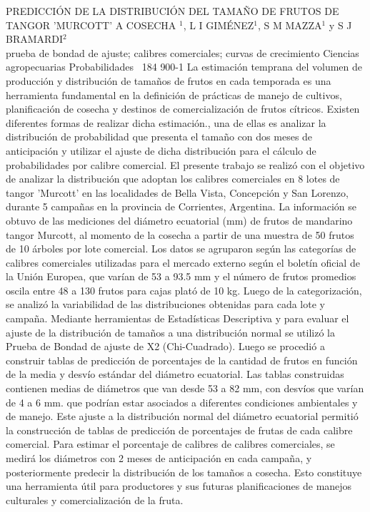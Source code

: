 \A
{PREDICCIÓN DE LA DISTRIBUCIÓN DEL TAMAÑO DE FRUTOS DE TANGOR 'MURCOTT' A COSECHA}
{$^1$, L I GIMÉNEZ$^1$, S M MAZZA$^1$ y S J BRAMARDI$^2$}
{
\\}
{prueba de bondad de ajuste; calibres comerciales; curvas de crecimiento} 
 {Ciencias agropecuarias} 
 {Probabilidades } 
 {184} 
 {900-1}
{La estimación temprana del volumen de producción y distribución de tamaños de frutos en cada temporada es una herramienta fundamental en la definición de prácticas de manejo de cultivos, planificación de cosecha y destinos de comercialización de frutos cítricos. Existen diferentes formas de realizar dicha estimación., una de ellas es analizar la distribución de probabilidad que presenta el tamaño con dos meses de anticipación y utilizar el ajuste de dicha distribución para el cálculo de probabilidades por calibre comercial. El presente trabajo se realizó con el objetivo de analizar la distribución que adoptan los calibres comerciales en 8 lotes de tangor 'Murcott' en las localidades de Bella Vista, Concepción y San Lorenzo, durante 5 campañas en la provincia de Corrientes, Argentina. La información se obtuvo de las mediciones del diámetro ecuatorial (mm) de frutos de mandarino tangor Murcott, al momento de la cosecha a partir de una muestra de 50 frutos de 10 árboles por lote comercial. Los datos se agruparon según las categorías de calibres comerciales utilizadas para el mercado externo según el boletín oficial de la Unión Europea, que varían de 53 a 93.5 mm y el número de frutos promedios oscila entre 48 a 130 frutos para cajas plató de 10 kg. Luego de la categorización, se analizó la variabilidad de las distribuciones obtenidas para cada lote y campaña. Mediante herramientas de Estadísticas Descriptiva y para evaluar el ajuste de la distribución de tamaños a una distribución normal se utilizó la Prueba de Bondad de ajuste de X2 (Chi-Cuadrado). Luego se procedió a construir tablas de predicción de porcentajes de la cantidad de frutos en función de la media y desvío estándar del diámetro ecuatorial. Las tablas construidas contienen medias de diámetros que van desde 53 a 82 mm, con desvíos que varían de 4 a 6 mm. que podrían estar asociados a diferentes condiciones ambientales y de manejo. Este ajuste a la distribución normal del diámetro ecuatorial permitió la construcción de tablas de predicción de porcentajes de frutas de cada calibre comercial. Para estimar el porcentaje de calibres de calibres comerciales, se medirá los diámetros con 2 meses de anticipación en cada campaña, y posteriormente predecir la distribución de los tamaños a cosecha. Esto constituye una herramienta útil para productores y sus futuras planificaciones de manejos culturales y comercialización de la fruta.}
